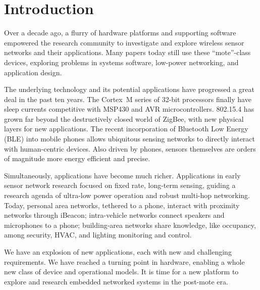 \section{Introduction}
\label{sec:intro}

Over a decade ago, a flurry of hardware platforms and supporting software
empowered the research community to investigate and explore wireless sensor
networks and their applications. Many papers today still use these
``mote''-class devices, exploring problems in systems software, low-power
networking, and application design.

The underlying technology and its potential applications have progressed a
great deal in the past ten years. The Cortex~M series of 32-bit processors
finally have sleep currents competitive with MSP430 and AVR microcontrollers.
802.15.4 has grown far beyond the destructively closed world of ZigBee, with
new physical layers for new applications. The recent incorporation of
Bluetooth Low Energy (BLE) into mobile phones allows ubiquitous sensing networks to
directly interact with human-centric devices. Also driven by phones, sensors
themselves are orders of magnitude more energy efficient and precise.

Simultaneously, applications have become much richer. Applications in early
sensor network research focused on fixed rate, long-term sensing, guiding a
research agenda of ultra-low power operation and robust multi-hop networking.
Today, personal area networks, tethered to a phone, interact with
proximity networks through iBeacon; intra-vehicle networks connect speakers
and microphones to a phone; building-area networks share knowledge, like
occupancy, among security, HVAC, and lighting monitoring and control.

We have an explosion of new applications, each with new and challenging
requirements. We have reached a turning point in hardware, enabling a whole
new class of device and operational models. It is time for a new platform to
explore and research embedded networked systems in the post-mote era.

